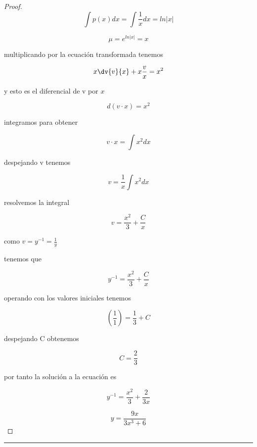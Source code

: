 \begin{itemize}
\begin{proof}
$$\int p(x)dx=\int \frac{1}{x}dx = ln|x|$$

$$\mu=e^{ln|x|}=x$$

multiplicando por la ecuación transformada tenemos

$$x\dv{v}{x}+x\frac{v}{x}=x^2$$

y esto es el diferencial de v por $x$

$$d(v\cdot x)=x^2$$

integramos para obtener

$$v\cdot x=\int x^2 dx$$

despejando v tenemos

$$v=\frac{1}{x}\int x^2 dx$$

resolvemos la integral 

$$v=\frac{x^2}{3}+\frac{C}{x}$$

como $v=y^{-1}=\frac{1}{y}$

tenemos que 

$$y^{-1}=\frac{x^2}{3}+\frac{C}{x}$$

operando con los valores iniciales tenemos

$$(\frac{1}{1})=\frac{1}{3}+C$$

despejando C obtenemos

$$C=\frac{2}{3}$$

por tanto la solución a la ecuación es

$$y^{-1}=\frac{x^2}{3}+\frac{2}{3x}$$

$$y=\frac{9x}{3x^3+6}$$

\end{proof}
 
 
\end{itemize}

\rule[2ex]{\textwidth}{2pt}\\




